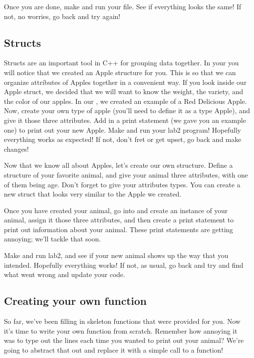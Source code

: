 \documentclass{tufte-handout}
\begin{document}
Once you are done, make and run your file.  See if everything looks the same!  If not, no worries, go back and try again!


\subsection{Structs}


Structs are an important tool in C++ for grouping data together.  In
your  you will notice that we created an Apple structure for you.  This is so that we can organize attributes of Apples together in a convenient way.  If you look inside our Apple struct, we decided that we will want to know the weight, the variety, and the color of our apples.  In our , we created an example of a Red Delicious Apple.  Now, create your own type of apple (you'll need to define it as a type Apple), and give it those three attributes.  Add in a print statement (we gave you an example one) to print out your new Apple.  Make and run your lab2 program!  Hopefully everything works as expected!  If not, don't fret or get upset, go back and make changes!


Now that we know all about Apples, let's create our own structure.  Define a structure of your favorite animal, and give your animal three attributes, with one of them being age. Don't forget to give your attributes types. You can create a new struct that looks very similar to the Apple we created.

Once you have created your animal, go into  and create an instance of your animal, assign it those three attributes, and then create a print statement to print out information about your animal.  These print statements are getting annoying; we'll tackle that soon.

Make and run lab2, and see if your new animal shows up the way that you intended.  Hopefully everything works!  If not, as usual, go back and try and find what went wrong and update your code. 



\subsection{Creating your own function}
So far, we've been filling in skeleton functions that were provided for you. Now it's time to write your own function from scratch.  Remember how annoying it was to type out the  lines each time you wanted to print out your animal?  We're going to abstract that out and replace it with a simple call to a function! 
\end{document}
